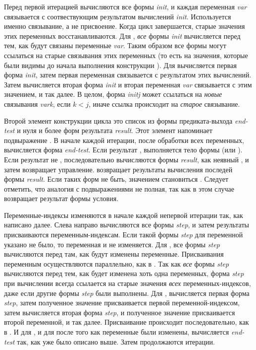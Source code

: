\begin{defmac}
Перед первой итерацией вычисляются все формы \emph{init}, и каждая переменная
\emph{var} связывается с соотвествующим результатом вычислений \emph{init}.
Используется именно связывание, а не присвоение. Когда цикл завершается, старые
значения этих переменных восстанавливаются.
Для , \emph{все} формы \emph{init} вычисляется перед тем, как будут
связаны переменные \emph{var}. Таким образом все формы могут ссылаться на старые
связывания этих переменных
(то есть на значения, которые были видимы до начала выполнения конструкции
).
Для  вычисляется первая форма \emph{init}, затем первая переменная
связывается с результатом этих вычислений. Затем вычисляется вторая форма
\emph{init} и вторая переменная \emph{var} связывается с этим значением, и так
далее.
В целом, форма \emph{initj} может ссылаться на \emph{новые} связывания
\emph{vark}, если $k<j$, иначе ссылка происходит на \emph{старое} связывание.

Второй элемент конструкции цикла это список из формы предиката-выхода
\emph{end-test} и нуля и более форм результата \emph{result}.
Этот элемент напоминает подвыражение .
В начале каждой итерации, после обработки всех переменных, вычисляется форма
\emph{end-test}. Если результат {\false}, выполняется тело формы  (или
).
Если результат не {\false}, последовательно вычисляются формы \emph{result}, как
неявный ,
и затем  возвращает управление.  возвращает результаты
вычисления последей формы \emph{result}.
Если таких форм не быть, значением  становиться {\false}.
Следует отметить, что аналогия с подвыражениями  не полная, так как
 в этом случае возвращает результат формы условия.

Переменные-индексы изменяются в начале каждой непервой итерации так, как
написано далее. Слева направо вычисляются все формы \emph{step}, и затем
результаты присваиваются переменным-индексам.
Если такой формы \emph{step} для переменной указано не было, то переменная и не
изменяется.
Для , все формы \emph{step} вычисляются перед там, как будут изменены
переменные. Присваивания переменным осуществляются параллельно, как в
.
Так как \emph{все} формы \emph{step} вычисляются перед тем, как будет изменена
хоть одна переменных, форма \emph{step} при вычислении всегда ссылается на
старые значения \emph{всех} переменных-индексов, даже если другие формы
\emph{step} были выполнены.
Для , вычисляется первая форма \emph{step}, затем полученное значение
присваивается первой переменной-индексом, затем вычисляется вторая форма
\emph{step}, и полученное значение присваивается второй переменной, и так
далее. Присваивание происходит последовательно, как в .
И для , и для  после того как переменные были изменены,
вычисляется \emph{end-test} так, как уже было описано выше. Затем продолжаются
итерации.


\end{defmac}
